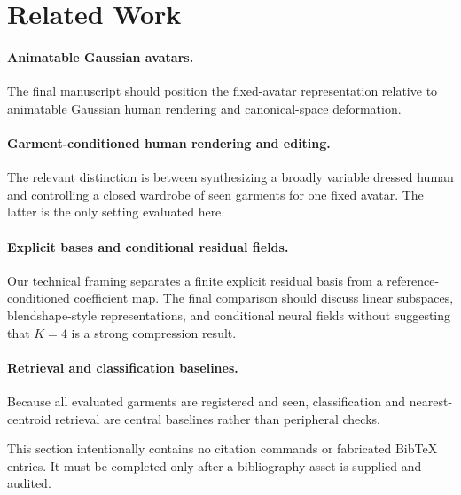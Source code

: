 \section{Related Work}

\paragraph{Animatable Gaussian avatars.}
The final manuscript should position the fixed-avatar representation relative to animatable Gaussian human rendering and canonical-space deformation. 

\paragraph{Garment-conditioned human rendering and editing.}
The relevant distinction is between synthesizing a broadly variable dressed human and controlling a closed wardrobe of seen garments for one fixed avatar. The latter is the only setting evaluated here. 

\paragraph{Explicit bases and conditional residual fields.}
Our technical framing separates a finite explicit residual basis from a reference-conditioned coefficient map. The final comparison should discuss linear subspaces, blendshape-style representations, and conditional neural fields without suggesting that $K=4$ is a strong compression result. 

\paragraph{Retrieval and classification baselines.}
Because all evaluated garments are registered and seen, classification and nearest-centroid retrieval are central baselines rather than peripheral checks. 

This section intentionally contains no citation commands or fabricated BibTeX entries. It must be completed only after a bibliography asset is supplied and audited.
